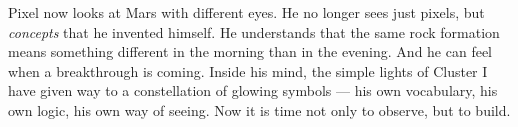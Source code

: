 \begin{tcolorbox}[colback=black!3, colframe=black!40, title=\textbf{Mission Log – End of Cluster III}]
Pixel now looks at Mars with different eyes.  He no longer sees just
pixels, but \emph{concepts} that he invented himself.  He understands
that the same rock formation means something different in the morning
than in the evening.  And he can feel when a breakthrough is coming.
Inside his mind, the simple lights of Cluster I have given way to a
constellation of glowing symbols — his own vocabulary, his own logic,
his own way of seeing.  Now it is time not only to observe, but to
build.
\end{tcolorbox}